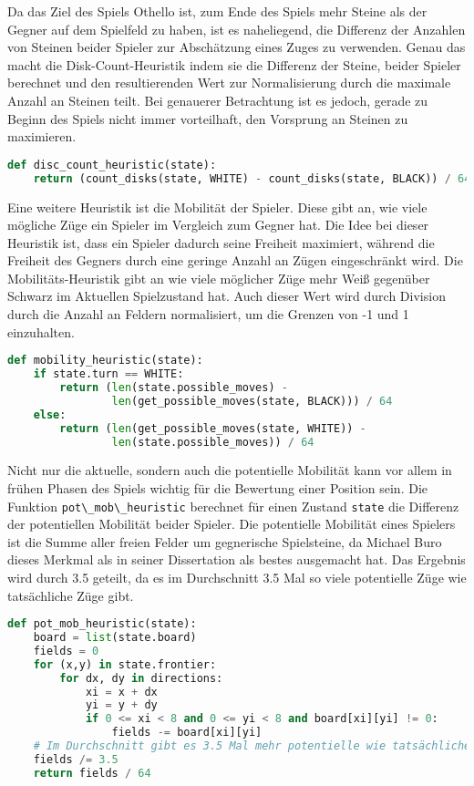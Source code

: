 Da das Ziel des Spiels Othello ist, zum Ende des Spiels mehr Steine als
der Gegner auf dem Spielfeld zu haben, ist es naheliegend, die Differenz
der Anzahlen von Steinen beider Spieler zur Abschätzung eines Zuges zu
verwenden. Genau das macht die Disk-Count-Heuristik indem sie die
Differenz der Steine, beider Spieler berechnet und den resultierenden
Wert zur Normalisierung durch die maximale Anzahl an Steinen teilt. Bei
genauerer Betrachtung ist es jedoch, gerade zu Beginn des Spiels nicht
immer vorteilhaft, den Vorsprung an Steinen zu maximieren.

\begin{lstlisting}[language=Python]
def disc_count_heuristic(state):
    return (count_disks(state, WHITE) - count_disks(state, BLACK)) / 64
\end{lstlisting}

Eine weitere Heuristik ist die Mobilität der Spieler. Diese gibt an, wie
viele mögliche Züge ein Spieler im Vergleich zum Gegner hat. Die Idee
bei dieser Heuristik ist, dass ein Spieler dadurch seine Freiheit
maximiert, während die Freiheit des Gegners durch eine geringe Anzahl an
Zügen eingeschränkt wird. Die Mobilitäts-Heuristik gibt an wie viele
möglicher Züge mehr Weiß gegenüber Schwarz im Aktuellen Spielzustand
hat. Auch dieser Wert wird durch Division durch die Anzahl an Feldern
normalisiert, um die Grenzen von -1 und 1 einzuhalten.

\begin{lstlisting}[language=Python]
def mobility_heuristic(state):
    if state.turn == WHITE:
        return (len(state.possible_moves) -
                len(get_possible_moves(state, BLACK))) / 64
    else:
        return (len(get_possible_moves(state, WHITE)) -
                len(state.possible_moves)) / 64
\end{lstlisting}

Nicht nur die aktuelle, sondern auch die potentielle Mobilität kann vor
allem in frühen Phasen des Spiels wichtig für die Bewertung einer
Position sein. Die Funktion
\passthrough{\lstinline!pot\_mob\_heuristic!} berechnet für einen
Zustand \passthrough{\lstinline!state!} die Differenz der potentiellen
Mobilität beider Spieler. Die potentielle Mobilität eines Spielers ist
die Summe aller freien Felder um gegnerische Spielsteine, da Michael
Buro dieses Merkmal als in seiner Dissertation als bestes ausgemacht
hat. Das Ergebnis wird durch 3.5 geteilt, da es im Durchschnitt 3.5 Mal
so viele potentielle Züge wie tatsächliche Züge gibt.

\begin{lstlisting}[language=Python]
def pot_mob_heuristic(state):
    board = list(state.board)
    fields = 0
    for (x,y) in state.frontier:
        for dx, dy in directions:
            xi = x + dx
            yi = y + dy
            if 0 <= xi < 8 and 0 <= yi < 8 and board[xi][yi] != 0:
                fields -= board[xi][yi]
    # Im Durchschnitt gibt es 3.5 Mal mehr potentielle wie tatsächliche Züge
    fields /= 3.5 
    return fields / 64
\end{lstlisting}

